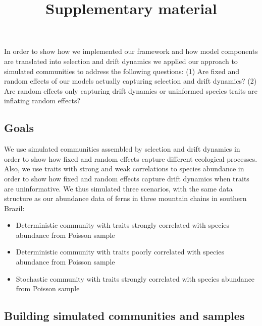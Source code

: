 \title{Supplementary material}
\author{}
\date{}


\maketitle



In order to show how we implemented our framework and how model
components are translated into selection and drift dynamics we applied
our approach to simulated communities to address
the following questions:
(1) Are fixed and random effects of our models actually
capturing selection and drift dynamics? (2) Are random effects only
capturing drift dynamics or uninformed species traits are inflating
random effects?


\subsection*{Goals}\label{material-and-methods}
We use simulated communities assembled by selection and drift dynamics
in order to show how fixed and random effects capture different
ecological processes. Also, we use traits with strong and weak
correlations to species abundance in order to show how fixed and
random effects capture drift dynamics when traits are
uninformative. We thus simulated three scenarios, with the same data
structure as our abundance data of ferns in three mountain chains in
southern Brazil:


\begin{itemize}
\tightlist
\item
  Deterministic community with traits strongly correlated with species abundance from Poisson sample
\item
  Deterministic community with traits poorly correlated with species abundance from Poisson sample
\item
  Stochastic community with traits strongly correlated with species abundance from Poisson sample
\end{itemize}



\subsection*{Building simulated
communities and samples}\label{building-simulated-communities}

